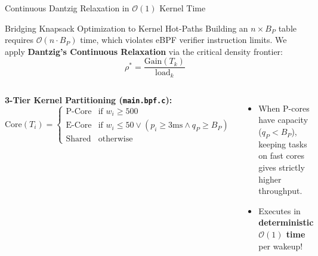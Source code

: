 \documentclass{beamer}
\begin{document}
\begin{frame}{Continuous Dantzig Relaxation in $\mathcal{O}(1)$ Kernel Time}
  \begin{block}{Bridging Knapsack Optimization to Kernel Hot-Paths}
    \footnotesize
    Building an $n \times B_P$ table requires $\mathcal{O}(n \cdot B_P)$ time, which violates eBPF verifier instruction limits.
    We apply \textbf{Dantzig's Continuous Relaxation} via the critical density frontier:
    $$\rho^* = \frac{\text{Gain}(T_k)}{\text{load}_k}$$
  \end{block}

  \vspace{0.1cm}
  \begin{columns}[T]
      \textbf{3-Tier Kernel Partitioning (\texttt{main.bpf.c}):}
      {\tiny
      $$\text{Core}(T_i) = \begin{cases} 
        \text{P-Core} & \text{if } w_i \ge 500 \\
        \text{E-Core} & \text{if } w_i \le 50 \lor (p_i \ge 3\text{ms} \land q_P \ge B_P) \\
        \text{Shared} & \text{otherwise}
      \end{cases}$$
      }
      \vspace{0.1cm}
      \begin{itemize}\itemsep2pt\tiny
        \item When P-cores have capacity ($q_P < B_P$), keeping tasks on fast cores gives strictly higher throughput.
        \item Executes in \textbf{deterministic $\mathcal{O}(1)$ time} per wakeup!
      \end{itemize}

  \end{columns}
\end{frame}
\end{document}

